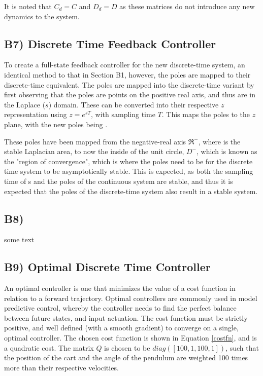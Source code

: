 \documentclass{article}
\begin{document}
It is noted that $C_d=C$ and $D_d=D$ as these matrices do not introduce any new dynamics to the system.



\subsection*{B7) Discrete Time Feedback Controller}
To create a full-state feedback controller for the new discrete-time system, an identical method to that in Section B1, however, the poles are mapped to their discrete-time equivalent. The poles are mapped into the discrete-time variant by first observing that the poles are points on the positive real axis, and thus are in the Laplace ($s$) domain. These can be converted into their respective $z$ representation using $z=e^{sT}$, with sampling time $T$. This maps the poles to the $z$ plane, with the new poles being . 
\newline

These poles have been mapped from the negative-real axis $\Re^-$, where is the stable Laplacian area, to now the inside of the unit circle, $D^-$, which is known as the "region of convergence", which is where the poles need to be for the discrete time system to be asymptotically stable. This is expected, as both the sampling time of s and 
the poles of the continuous system are stable, and thus it is expected that the poles of the discrete-time system also result in a stable system. 




\subsection*{B8) }
some text


\subsection*{B9) Optimal Discrete Time Controller}
An optimal controller is one that minimizes the value of a cost function in relation to a forward trajectory. Optimal controllers are commonly used in model predictive control, whereby the controller needs to find the perfect balance between future states, and input actuation. The cost function must be strictly positive, and well defined (with a smooth gradient) to converge on a single, optimal controller. The chosen cost function is shown in Equation \ref{costfn}, and is a quadratic cost. The matrix $Q$ is chosen to be $diag([100, 1, 100, 1])$, such that the position of the cart and the angle of the pendulum are weighted 100 times more than their respective velocities.
\end{document}
